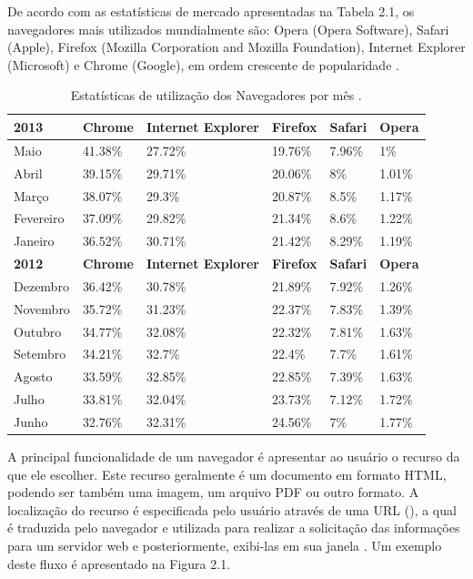 \documentclass[espaco=simples,appendix=Name]{abnt}
\begin{document}
De acordo com as estatísticas de mercado apresentadas na Tabela 2.1, os navegadores mais utilizados mundialmente são: Opera (Opera Software), Safari (Apple), Firefox (Mozilla Corporation and Mozilla Foundation), Internet Explorer (Microsoft) e Chrome (Google), em ordem crescente de popularidade \cite{BrowserStats}.

\begin{table}[ht]
	\centering
	\caption{Estatísticas de utilização dos Navegadores por mês \cite{BrowserStats}.
	\label{tbl:padc}}{
		\vspace{0.4cm}
		\begin{tabular}{|l|l|l|l|l|l|}
	    	\hline
			\textbf{2013} & \textbf{Chrome} & \textbf{Internet Explorer} &\textbf{Firefox} & \textbf{Safari} & \textbf{Opera} \\
			\hline
			Maio		& 41.38\%	&	27.72\%	&	19.76\%	&	7.96\%	&	1\%		\\
			\hline
			Abril		& 39.15\%	&	29.71\%	&	20.06\%	&	8\%		&	1.01\%	\\
			\hline
			Março		& 38.07\%	&	29.3\%	&	20.87\%	&	8.5\%	&	1.17\%	\\
			\hline
			Fevereiro	& 37.09\%	&	29.82\%	&	21.34\%	&	8.6\%	&	1.22\%	\\
			\hline
			Janeiro		& 36.52\%	&	30.71\%	&	21.42\%	&	8.29\%	&	1.19\%	\\
			\hline
			
			\textbf{2012} & \textbf{Chrome} & \textbf{Internet Explorer} &\textbf{Firefox} & \textbf{Safari} & \textbf{Opera} \\
			\hline
			Dezembro	& 36.42\%	&	30.78\%	&	21.89\%	&	7.92\%	&	1.26\%	\\
			\hline
			Novembro	& 35.72\%	&	31.23\%	&	22.37\%	&	7.83\%	&	1.39\%	\\
			\hline
			Outubro		& 34.77\%	&	32.08\%	&	22.32\%	&	7.81\%	&	1.63\%	\\
			\hline
			Setembro	& 34.21\%	&	32.7\%	&	22.4\%	&	7.7\%	&	1.61\%	\\
			\hline
			Agosto		& 33.59\%	&	32.85\%	&	22.85\%	&	7.39\%	&	1.63\%	\\
			\hline
			Julho		& 33.81\%	&	32.04\%	&	23.73\%	&	7.12\%	&	1.72\%	\\
			\hline
			Junho		& 32.76\%	&	32.31\%	&	24.56\%	&	7\%		&	1.77\%	\\
		\end{tabular}
		}
\end{table}

A principal funcionalidade de um navegador é apresentar ao usuário o recurso da  que ele escolher. Este  recurso geralmente é um documento em formato HTML, podendo ser também uma imagem, um arquivo PDF ou outro formato. A localização do recurso é especificada pelo usuário através de uma URL (), a qual é traduzida pelo navegador e utilizada para realizar a solicitação das informações para um servidor web e posteriormente, exibi-las em sua janela \cite{ArchitectureWebBrowsers}. Um exemplo deste fluxo é apresentado na Figura 2.1.
\end{document}
